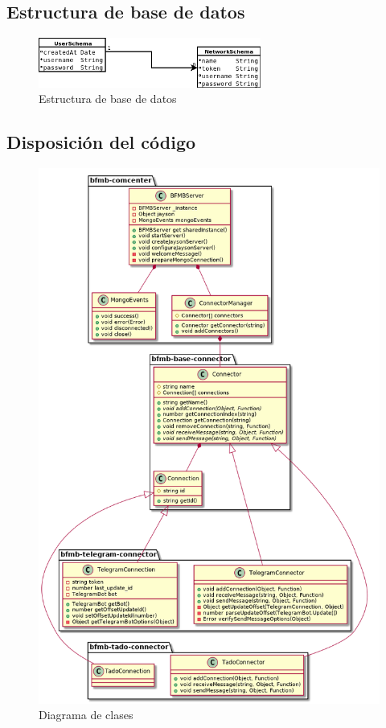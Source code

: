 \documentclass[spanish,12pt, a4paper, twoside]{paper}
\begin{document}
\subsection{Estructura de base de datos}

\begin{figure}
\centering
	\includegraphics[width=0.65\textwidth]{recursos/schemes}
\caption{Estructura de base de datos}
\label{fig:Estructura de base de datos}
\end{figure}

\subsection{Disposición del código}

\begin{figure}
\centering
	\includegraphics[width=\textwidth]{recursos/classes}
\caption{Diagrama de clases}
\label{fig:Diagrama de clases}
\end{figure}
\end{document}
